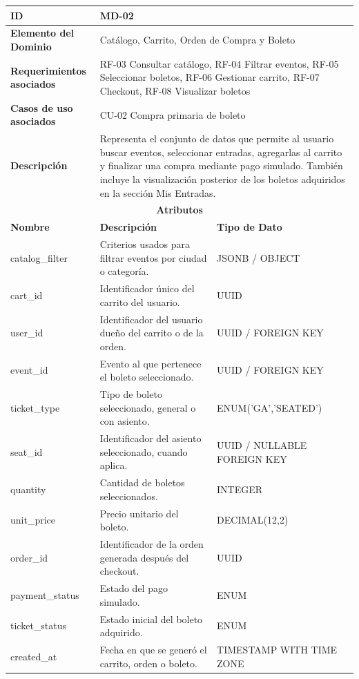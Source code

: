 \documentclass[12pt,letterpaper]{article}
\begin{document}
\begin{table}[H]
\centering
\scriptsize
\renewcommand{\arraystretch}{1.12}
\setlength{\tabcolsep}{4pt}

\begin{tabularx}{\textwidth}{|p{3.2cm}|X|p{3.8cm}|}
\hline
\textbf{ID} & MD-02 & \\ \hline

\textbf{Elemento del Dominio} & 
\multicolumn{2}{X|}{Catálogo, Carrito, Orden de Compra y Boleto} \\ \hline

\textbf{Requerimientos asociados} & 
\multicolumn{2}{X|}{RF-03 Consultar catálogo, RF-04 Filtrar eventos, RF-05 Seleccionar boletos, RF-06 Gestionar carrito, RF-07 Checkout, RF-08 Visualizar boletos} \\ \hline

\textbf{Casos de uso asociados} & 
\multicolumn{2}{X|}{CU-02 Compra primaria de boleto} \\ \hline

\textbf{Descripción} & 
\multicolumn{2}{X|}{Representa el conjunto de datos que permite al usuario buscar eventos, seleccionar entradas, agregarlas al carrito y finalizar una compra mediante pago simulado. También incluye la visualización posterior de los boletos adquiridos en la sección Mis Entradas.} \\ \hline

\multicolumn{3}{|c|}{\textbf{Atributos}} \\ \hline

\textbf{Nombre} & \textbf{Descripción} & \textbf{Tipo de Dato} \\ \hline

catalog\_filter & Criterios usados para filtrar eventos por ciudad o categoría. & JSONB / OBJECT \\ \hline
cart\_id & Identificador único del carrito del usuario. & UUID \\ \hline
user\_id & Identificador del usuario dueño del carrito o de la orden. & UUID / FOREIGN KEY \\ \hline
event\_id & Evento al que pertenece el boleto seleccionado. & UUID / FOREIGN KEY \\ \hline
ticket\_type & Tipo de boleto seleccionado, general o con asiento. & ENUM('GA','SEATED') \\ \hline
seat\_id & Identificador del asiento seleccionado, cuando aplica. & UUID / NULLABLE FOREIGN KEY \\ \hline
quantity & Cantidad de boletos seleccionados. & INTEGER \\ \hline
unit\_price & Precio unitario del boleto. & DECIMAL(12,2) \\ \hline
order\_id & Identificador de la orden generada después del checkout. & UUID \\ \hline
payment\_status & Estado del pago simulado. & ENUM\\ \hline
ticket\_status & Estado inicial del boleto adquirido. & ENUM \\ \hline
created\_at & Fecha en que se generó el carrito, orden o boleto. & TIMESTAMP WITH TIME ZONE \\ \hline


\end{tabularx}
\end{table}
\end{document}
